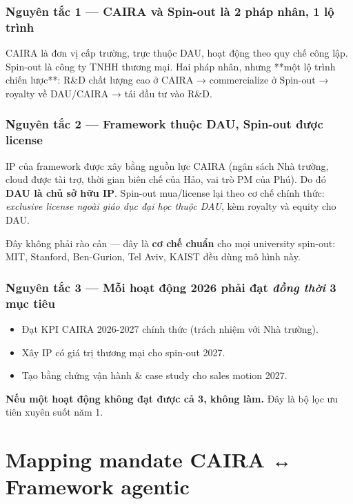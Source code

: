 \documentclass[11pt,a4paper]{article}
\begin{document}
\subsubsection*{Nguyên tắc 1 — CAIRA và Spin-out là 2 pháp nhân, 1 lộ trình}

CAIRA là đơn vị cấp trường, trực thuộc DAU, hoạt động theo quy chế công lập. Spin-out
là công ty TNHH thương mại. Hai pháp nhân, nhưng **một lộ trình chiến lược**: R\&D
chất lượng cao ở CAIRA → commercialize ở Spin-out → royalty về DAU/CAIRA → tái
đầu tư vào R\&D.

\subsubsection*{Nguyên tắc 2 — Framework thuộc DAU, Spin-out được license}

IP của framework được xây bằng nguồn lực CAIRA (ngân sách Nhà trường, cloud
được tài trợ, thời gian biên chế của Hảo, vai trò PM của Phú). Do đó \textbf{DAU
là chủ sở hữu IP}. Spin-out mua/license lại theo cơ chế chính thức: \textit{exclusive
license ngoài giáo dục đại học thuộc DAU}, kèm royalty và equity cho DAU.

Đây không phải rào cản — đây là \textbf{cơ chế chuẩn} cho mọi university spin-out:
MIT, Stanford, Ben-Gurion, Tel Aviv, KAIST đều dùng mô hình này.

\subsubsection*{Nguyên tắc 3 — Mỗi hoạt động 2026 phải đạt \textit{đồng thời} 3 mục tiêu}

\begin{itemize}
\item Đạt KPI CAIRA 2026-2027 chính thức (trách nhiệm với Nhà trường).
\item Xây IP có giá trị thương mại cho spin-out 2027.
\item Tạo bằng chứng vận hành \& case study cho sales motion 2027.
\end{itemize}

\textbf{Nếu một hoạt động không đạt được cả 3, không làm.} Đây là bộ lọc ưu tiên
xuyên suốt năm 1.

\clearpage

\section{Mapping mandate CAIRA ↔ Framework agentic}
\end{document}
